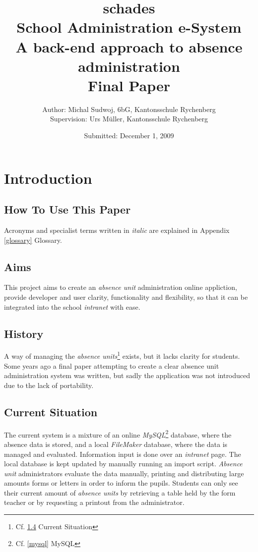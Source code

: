 \documentclass[12pt,a4paper,twoside,openany]{report}
\begin{document}
\selectfont

\title{schades \\ School Administration e-System \\ \large{A back-end
approach to absence administration} \\ \large{Final Paper}} \author{Author:
Michal Sudwoj, 6bG, Kantonsschule Rychenberg \\ Supervision: Urs M\"{u}ller,
Kantonsschule Rychenberg}
\date{Submitted: December 1, 2009}
\maketitle
\thispagestyle{empty}

\newpage
\thispagestyle{empty}
\mbox{}

\newpage
\tableofcontents

\chapter{Introduction}

\section{How To Use This Paper}
Acronyms and specialist terms written in \textit{italic} are explained in
Appendix \ref{glossary} Glossary.

\section{Aims}
This project aims to create an \textit{absence unit} administration online
appliction, provide developer and user clarity, functionality and flexibility, so that it
can be integrated into the school \textit{intranet} with ease.

\section{History}
A way of managing the \textit{absence units}\footnote{Cf.
\ref{situation} Current Situation} exists, but it lacks clarity for students.
Some years ago a final paper\cite{gubler} attempting to create a clear absence
unit administration system was written, but sadly the application was not
introduced due to the lack of portability.

\section{Current Situation}
\label{situation}
The current system is a mixture of an online
\textit{MySQL}\footnote{Cf. \ref{mysql} MySQL} database, where the absence data
is stored, and a local \textit{FileMaker} database, where the data is managed and evaluated.
Information input is done over an \textit{intranet} page. The local database is
kept updated by manually running an import script. \textit{Absence unit}
administrators evaluate the data manually, printing and distributing large amounts forms or
letters in order to inform the pupils. Students can only see their current
amount of \textit{absence units} by retrieving a table held by the form teacher
or by requesting a printout from the administrator.
\end{document}
